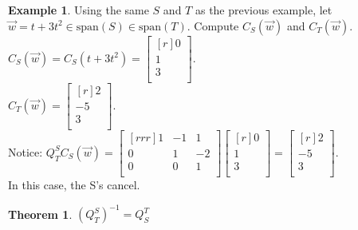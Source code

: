\documentclass{report}
\theoremstyle{plain}
\newtheorem*{thrm}{Theorem}
\theoremstyle{definition}
\newtheorem*{ex}{Example}
\theoremstyle{plain}
\begin{document}
\begin{ex}
Using the same $S$ and $T$ as the previous example, let $\vec{w} = t+3t^2\in \mathrm{span}(S) \in \mathrm{span}(T)$. Compute $C_S(\vec{w})$ and $C_T(\vec{w})$.
$C_S(\vec{w}) = C_S(t+3t^2) = \begin{bmatrix}[r]0\\1\\3\\\end{bmatrix}$.\\
$C_T(\vec{w})=\begin{bmatrix}[r]2\\-5\\3\\\end{bmatrix}$.\\
Notice: $Q_T^SC_S(\vec{w}) = \begin{bmatrix}[rrr]1&-1&1\\0&1&-2\\0&0&1\\\end{bmatrix}\begin{bmatrix}[r]0\\1\\3\\\end{bmatrix} = \begin{bmatrix}[r]2\\-5\\3\\\end{bmatrix}$.\\
In this case, the S's cancel.
\end{ex}
\begin{thrm}
$(Q_T^S)^{-1} = Q_S^T$
\end{thrm}
\end{document}
